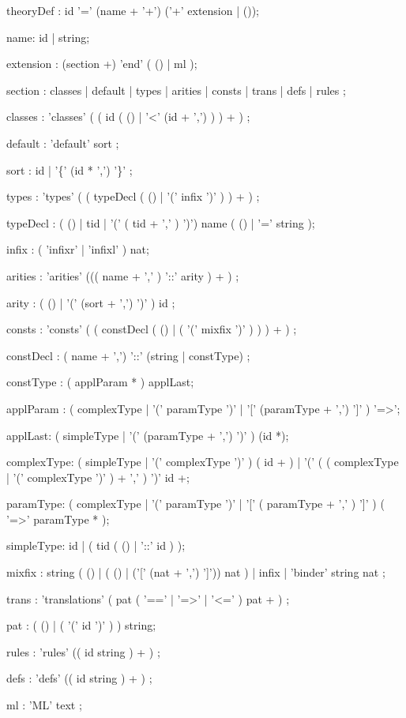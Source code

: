 \begin{rail}

theoryDef : id '=' (name + '+') ('+' extension | ());

name: id | string;

extension : (section +) 'end' ( () | ml );

section : classes
        | default
        | types
        | arities
        | consts
        | trans
        | defs
        | rules
        ;

classes : 'classes' ( ( id (  ()
                            | '<' (id + ',')
                           ) 
                       ) + )
        ;

default : 'default' sort 
        ;

sort :  id
     | '\{' (id * ',') '\}'
     ;

types : 'types' ( ( typeDecl ( () | '(' infix ')' ) ) + )
      ;

typeDecl : ( () | tid | '(' ( tid + ',' ) ')') name ( () | '='  string );

infix : ( 'infixr' | 'infixl' ) nat;


arities : 'arities' ((( name + ',' ) '::' arity ) + )
        ;

arity   : ( () 
          | '(' (sort + ',') ')' 
          ) id
        ;


consts : 'consts' ( ( constDecl ( () | ( '(' mixfix ')' ) ) ) + )
       ;

constDecl : ( name + ',') '::' (string | constType) ;

constType : ( applParam * ) applLast;

applParam : ( complexType | '(' paramType ')' |
              '[' (paramType + ',') ']' ) '=>';

applLast: ( simpleType | '(' (paramType + ',') ')' ) (id *);

complexType: ( simpleType | '(' complexType ')' ) ( id + ) |
             '(' ( ( complexType | '(' complexType ')' ) + ',' ) ')'
             id +;

paramType: ( complexType | '(' paramType ')' | '[' ( paramType + ',' ) ']' )
           ( '=>' paramType * );

simpleType: id | ( tid ( () | '::' id ) );

mixfix :  string ( () | ( () | ('[' (nat + ',') ']')) nat )
       | infix
       | 'binder' string nat ;

trans : 'translations' ( pat ( '==' | '=>' | '<=' ) pat + )
      ;

pat : ( () | ( '(' id ')' ) ) string;

rules : 'rules' (( id string ) + )
      ;

defs : 'defs' (( id string ) + )
     ;

ml : 'ML' text
   ;

\end{rail}
